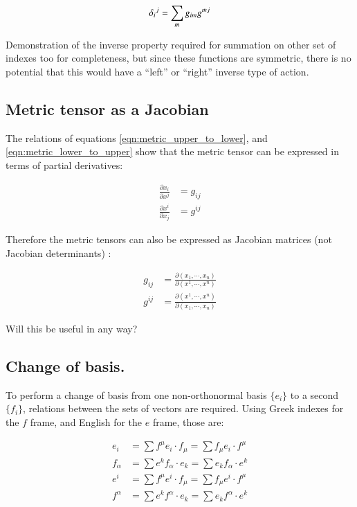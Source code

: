 \documentclass{article}      %
\begin{document}
\begin{equation}
{\delta_{i}}^j = \sum_m g_{im} g^{mj} \\
\end{equation}

Demonstration of the inverse property required for summation on other set of indexes too for completeness, but since these functions are symmetric, there 
is no potential that this would have a ``left'' or ``right'' inverse type of action.

\subsection{ Metric tensor as a Jacobian }

The relations of equations \ref{eqn:metric_upper_to_lower}, and \ref{eqn:metric_lower_to_upper} show that the metric tensor can be expressed in terms of partial derivatives:

\begin{align}
\frac{\partial x_i }{\partial x^j } &= g_{ij} \\
\frac{\partial x^i }{\partial x_j } &= g^{ij}
\end{align}

Therefore the metric tensors can also be expressed as Jacobian matrices (not Jacobian determinants) :

\begin{align}
g_{ij} &= \frac{\partial (x_1, \cdots, x_n) }{\partial (x^1, \cdots, x^n) } \\
g^{ij} &= \frac{\partial (x^1, \cdots, x^n) }{\partial (x_1, \cdots, x_n) }
\end{align}

Will this be useful in any way?

\subsection{ Change of basis. }

To perform a change of basis from one non-orthonormal basis $\{e_i\}$ to a second $\{f_i\}$, relations between the sets of vectors
are required.  Using Greek indexes for the $f$ frame, and English for the $e$ frame, those are:

\begin{align*}
e_i 		&= \sum f^{\mu} e_i \cdot f_{\mu} 	= \sum f_{\mu} e_i \cdot f^{\mu} \\
f_{\alpha} 	&= \sum e^k f_{\alpha} \cdot e_k 	= \sum e_k f_{\alpha} \cdot e^k \\
e^i 		&= \sum f^{\mu} e^i \cdot f_{\mu} 	= \sum f_{\mu} e^i \cdot f^{\mu} \\
f^{\alpha} 	&= \sum e^k f^{\alpha} \cdot e_k 	= \sum e_k f^{\alpha} \cdot e^k 
\end{align*}
\end{document}
